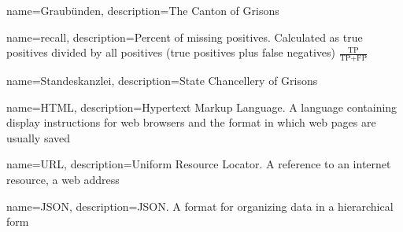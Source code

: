 \makenoidxglossaries


{
    name=Graubünden,
    description={The Canton of Grisons}
}

{
    name=recall,
    description={Percent of missing positives. 
    Calculated as true positives divided by all positives (true positives plus false negatives) $\frac{\text{TP}}{\text{TP}+\text{FP}}$}
}

{
    name=Standeskanzlei,
    description={State Chancellery of Grisons}
}

{
    name=HTML,
    description={Hypertext Markup Language. 
        A language containing display instructions for web browsers 
        and the format in which web pages are usually saved
    }
}

{
    name=URL,
    description={Uniform Resource Locator. 
    A reference to an internet resource, a web address}
}

{
    name=JSON,
    description={\acrlong{JSON}. A format for organizing data in a hierarchical form}
}



